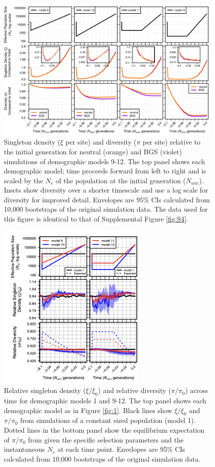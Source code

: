 \documentclass[9pt,twocolumn,twoside]{rilabRxiv}
\begin{document}
\begin{figure}[h!]
\includegraphics[width=0.8\linewidth]{figures/FigS8.pdf}
\caption{Singleton density ($\xi$ per site) and diversity ($\pi$ per site) relative to the initial generation for neutral (orange) and BGS (violet) simulations of demographic models 9-12.
The top panel shows each demographic model; time proceeds forward from left to right and is scaled by the $N_e$ of the population at the initial generation ($N_{anc}$).
Insets show diversity over a shorter timescale and use a log scale for diversity for improved detail.
Envelopes are 95\% CIs calculated from 10,000 bootstraps of the original simulation data.
The data used for this figure is identical to that of Supplemental Figure \ref{fig:S4}.}
\label{fig:S8}
\end{figure}
\pagebreak

\begin{figure}[]
\includegraphics[width=0.5\linewidth]{figures/figsup912.png}
\caption{Relative singleton density ($\xi/\xi_0$) and relative diversity ($\pi/\pi_0$) across time for demographic models 1 and 9-12.
The top panel shows each demographic model as in Figure \ref{fig:1}.
Black lines show $\xi/\xi_0$ and $\pi/\pi_0$ from simulations of a constant sized population (model 1).
Dotted lines in the bottom panel show the equilibrium  expectation of $\pi/\pi_0$ from  \citet{nordborg1996effect} given the specific selection parameters and the instantaneous $N_e$ at each time point.
Envelopes are 95\% CIs calculated from 10,000 bootstraps of the original simulation data.}
\label{fig:S912}
\end{figure}
\pagebreak
\end{document}
